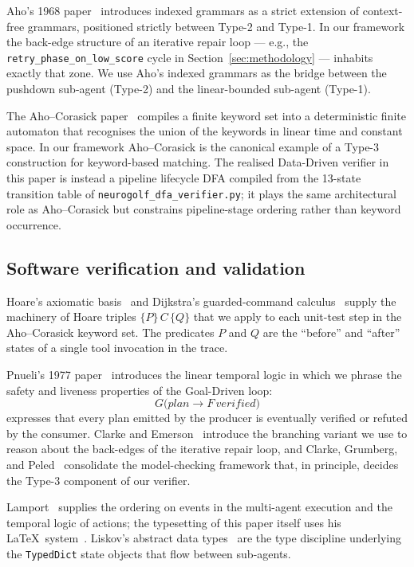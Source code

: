 Aho's 1968 paper~\cite{aho1968indexed} introduces indexed
grammars as a strict extension of context-free grammars,
positioned strictly between Type-2 and Type-1.  In our framework
the back-edge structure of an iterative repair loop --- e.g.,
the \texttt{retry\_phase\_on\_low\_score} cycle in
Section~\ref{sec:methodology} --- inhabits exactly that zone.  We
use Aho's indexed grammars as the bridge between the pushdown
sub-agent (Type-2) and the linear-bounded sub-agent (Type-1).

The Aho--Corasick paper~\cite{aho1975corasick} compiles a finite
keyword set into a deterministic finite automaton that recognises
the union of the keywords in linear time and constant space.  In
our framework Aho--Corasick is the canonical example of a
Type-3 construction for keyword-based matching.  The realised
Data-Driven verifier in this paper is instead a pipeline lifecycle
DFA compiled from the 13-state transition table of
\texttt{neurogolf\_dfa\_verifier.py}; it plays the same
architectural role as Aho--Corasick but constrains pipeline-stage
ordering rather than keyword occurrence.

\subsection{Software verification and validation}

Hoare's axiomatic basis~\cite{hoare1969axiomatic} and Dijkstra's
guarded-command calculus~\cite{dijkstra1975guarded} supply the
machinery of Hoare triples $\{P\}\,C\,\{Q\}$ that we apply to
each unit-test step in the Aho--Corasick keyword set.  The
predicates $P$ and $Q$ are the ``before'' and ``after'' states
of a single tool invocation in the trace.

Pnueli's 1977 paper~\cite{pnueli1977temporal} introduces the
linear temporal logic in which we phrase the safety and
liveness properties of the Goal-Driven loop:
\[
G\bigl(\mathit{plan} \rightarrow F\,\mathit{verified}\bigr)
\]
expresses that every plan emitted by the producer is eventually
verified or refuted by the consumer.  Clarke and
Emerson~\cite{clarke1981ctl} introduce the branching variant we
use to reason about the back-edges of the iterative repair loop,
and Clarke, Grumberg, and Peled~\cite{clarke1999modelchecking}
consolidate the model-checking framework that, in principle,
decides the Type-3 component of our verifier.

Lamport~\cite{lamport1978clocks,lamport1994tla} supplies the
ordering on events in the multi-agent execution and the temporal
logic of actions; the typesetting of this paper itself uses his
\LaTeX\ system~\cite{lamport1986latex}.  Liskov's abstract data
types~\cite{liskov1974abstraction} are the type discipline
underlying the \texttt{TypedDict} state objects that flow between
sub-agents.

